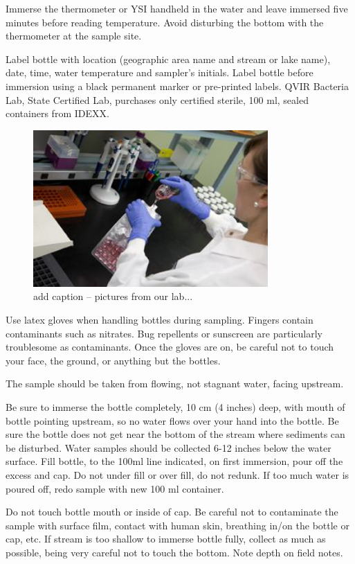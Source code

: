 \documentclass[12pt]{../SOP4_alpha}\usepackage[]{graphicx}\usepackage[]{xcolor}
\begin{document}
\NP Immerse the thermometer or YSI handheld in the water and leave immersed
five minutes before reading temperature. Avoid disturbing the bottom with
the thermometer at the sample site.

\NP Label bottle with location (geographic area name and stream or lake name),
date, time, water temperature and sampler's initials. Label bottle before
immersion using a black permanent marker or pre-printed labels. QVIR
Bacteria Lab, State Certified Lab, purchases only certified sterile, 100 ml,
sealed containers from IDEXX.

\begin{figure}
\includegraphics[width=0.8\textwidth]{Step2.jpg}
\caption{add caption -- pictures from our lab...}
\end{figure}

\NP Use latex gloves when handling bottles during sampling. Fingers contain
contaminants such as nitrates. Bug repellents or sunscreen are particularly troublesome as contaminants. Once the gloves are on, be careful not to touch
your face, the ground, or anything but the bottles.

\NP The sample should be taken from flowing, not stagnant water, facing
upstream.

\NP Be sure to immerse the bottle completely, 10 cm (4 inches) deep, with
mouth of bottle pointing upstream, so no water flows over your hand into the
bottle. Be sure the bottle does not get near the bottom of the stream where
sediments can be disturbed. Water samples should be collected 6-12 inches
below the water surface. Fill bottle, to the 100ml line indicated, on first
immersion, pour off the excess and cap. Do not under fill or over fill, do not
redunk. If too much water is poured off, redo sample with new 100 ml
container.

\NP Do not touch bottle mouth or inside of cap. Be careful not to
contaminate the sample with surface film, contact with human skin, breathing
in/on the bottle or cap, etc. If stream is too shallow to immerse bottle fully,
collect as much as possible, being very careful not to touch the bottom. Note
depth on field notes.
\end{document}
